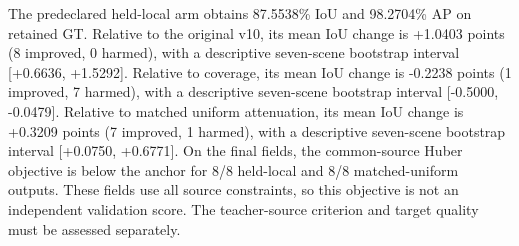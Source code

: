 The predeclared held-local arm obtains 87.5538\% IoU and 98.2704\% AP on retained GT.
Relative to the original v10, its mean IoU change is +1.0403 points (8 improved, 0 harmed), with a descriptive seven-scene bootstrap interval [+0.6636, +1.5292].
Relative to coverage, its mean IoU change is -0.2238 points (1 improved, 7 harmed), with a descriptive seven-scene bootstrap interval [-0.5000, -0.0479].
Relative to matched uniform attenuation, its mean IoU change is +0.3209 points (7 improved, 1 harmed), with a descriptive seven-scene bootstrap interval [+0.0750, +0.6771].
On the final fields, the common-source Huber objective is below the anchor for 8/8 held-local and 8/8 matched-uniform outputs. These fields use all source constraints, so this objective is not an independent validation score. The teacher-source criterion and target quality must be assessed separately.

